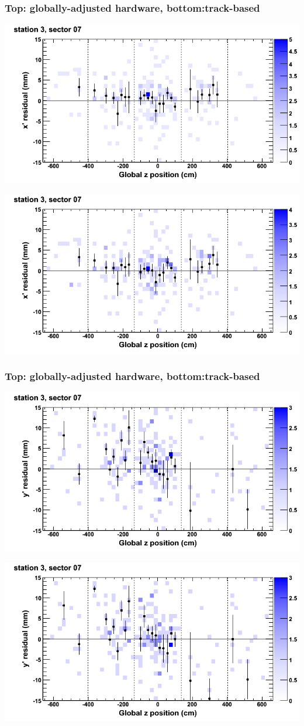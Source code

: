 \documentclass[compress]{beamer}
\begin{document}
\begin{frame}
\frametitle{Top: globally-adjusted hardware, bottom:track-based}
\includegraphics[width=0.7\linewidth]{NOV4_mapplots_HW/DTvsz_st3sec07_x.png}

\includegraphics[width=0.7\linewidth]{NOV4_mapplots/DTvsz_st3sec07_x.png}
\end{frame}

\begin{frame}
\frametitle{Top: globally-adjusted hardware, bottom:track-based}
\includegraphics[width=0.7\linewidth]{NOV4_mapplots_HW/DTvsz_st3sec07_y.png}

\includegraphics[width=0.7\linewidth]{NOV4_mapplots/DTvsz_st3sec07_y.png}
\end{frame}
\end{document}
